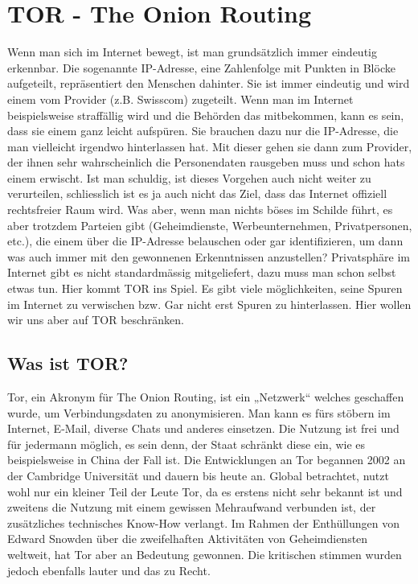 \section{TOR - The Onion Routing}
Wenn man sich im Internet bewegt, ist man grundsätzlich immer eindeutig erkennbar. Die sogenannte IP-Adresse, eine Zahlenfolge mit Punkten in Blöcke aufgeteilt, repräsentiert den Menschen dahinter. Sie ist immer eindeutig und wird einem vom Provider (z.B. Swisscom) zugeteilt. Wenn man im Internet beispielsweise straffällig wird und die Behörden das mitbekommen, kann es sein, dass sie einem ganz leicht aufspüren. Sie brauchen dazu nur die IP-Adresse, die man vielleicht irgendwo hinterlassen hat. Mit dieser gehen sie dann zum Provider, der ihnen sehr wahrscheinlich die Personendaten rausgeben muss und schon hats einem erwischt. Ist man schuldig, ist dieses Vorgehen auch nicht weiter zu verurteilen, schliesslich ist es ja auch nicht das Ziel, dass das Internet offiziell rechtsfreier Raum wird. Was aber, wenn man nichts böses im Schilde führt, es aber trotzdem Parteien gibt (Geheimdienste, Werbeunternehmen, Privatpersonen, etc.), die einem über die IP-Adresse belauschen oder gar identifizieren, um dann was auch immer mit den gewonnenen Erkenntnissen anzustellen? Privatsphäre im Internet gibt es nicht standardmässig mitgeliefert, dazu muss man schon selbst etwas tun. Hier kommt TOR ins Spiel. Es gibt viele möglichkeiten, seine Spuren im Internet zu verwischen bzw. Gar nicht erst Spuren zu hinterlassen. Hier wollen wir uns aber auf TOR beschränken.

\subsection{Was ist TOR?}
Tor, ein Akronym für The Onion Routing, ist ein „Netzwerk“ welches geschaffen wurde, um Verbindungsdaten zu anonymisieren. Man kann es fürs stöbern im Internet, E-Mail, diverse Chats und anderes einsetzen. Die Nutzung ist frei und für jedermann möglich, es sein denn, der Staat schränkt diese ein, wie es beispielsweise in China der Fall ist. Die Entwicklungen an Tor begannen 2002 an der Cambridge Universität und dauern bis heute an. Global betrachtet, nutzt wohl nur ein kleiner Teil der Leute Tor, da es erstens nicht sehr bekannt ist und zweitens die Nutzung mit einem gewissen Mehraufwand verbunden ist, der zusätzliches technisches Know-How verlangt. Im Rahmen der Enthüllungen von Edward Snowden über die zweifelhaften Aktivitäten von Geheimdiensten weltweit, hat Tor aber an Bedeutung gewonnen. Die kritischen stimmen wurden jedoch ebenfalls lauter und das zu Recht.

